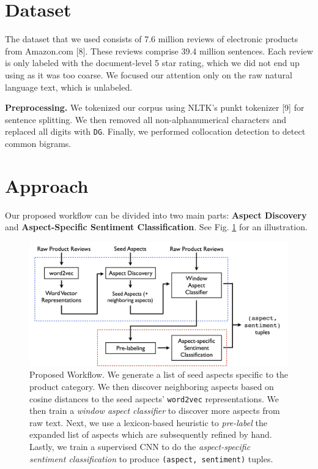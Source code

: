 \documentclass{article} %
\begin{document}

\section{Dataset}
The dataset that we used consists of 7.6 million reviews of electronic products from Amazon.com [8]. These reviews comprise 39.4 million sentences. Each review is only labeled with the document-level 5 star rating, which we did not end up using as it was too coarse. We focused our attention only on the raw natural language text, which is unlabeled.

\textbf{Preprocessing.} We tokenized our corpus using NLTK's punkt tokenizer [9] for sentence splitting. We then removed all non-alphanumerical characters and replaced all digits with \texttt{DG}. Finally, we performed collocation detection to detect common bigrams.

\section{Approach}

Our proposed workflow can be divided into two main parts: {\bf Aspect Discovery} and {\bf Aspect-Specific Sentiment Classification}. See Fig. \ref{workflow} for an illustration.

\begin{figure}[ht]
\begin{center}
\includegraphics[width=.85\columnwidth]{workflow.png}
\end{center}
\caption{Proposed Workflow. We generate a list of seed aspects specific to the product category. We then discover neighboring aspects based on cosine distances to the seed aspects' \texttt{word2vec} representations. We then train a \textit{window aspect classifier} to discover more aspects from raw text. Next, we use a lexicon-based heuristic to \textit{pre-label} the expanded list of aspects which are subsequently refined by hand. Lastly, we train a supervised CNN to do the \textit{aspect-specific sentiment classification} to produce \texttt{(aspect, sentiment)} tuples.}
\label{workflow}
\end{figure}
\end{document}
